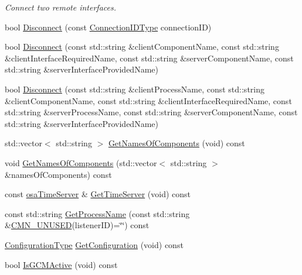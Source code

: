 \begin{DoxyCompactItemize}
\begin{DoxyCompactList}\small\item\em Connect two remote interfaces. \end{DoxyCompactList}\item 
bool \hyperlink{classmts_manager_local_a1c9d984c15b9f2f2e895db18cca18ece}{Disconnect} (const \hyperlink{mts_forward_declarations_8h_ad3543bb11742e1766374ec96016d6547}{Connection\+I\+D\+Type} connection\+I\+D)
\item 
bool \hyperlink{classmts_manager_local_a2895172c0982e44924222883608a8355}{Disconnect} (const std\+::string \&client\+Component\+Name, const std\+::string \&client\+Interface\+Required\+Name, const std\+::string \&server\+Component\+Name, const std\+::string \&server\+Interface\+Provided\+Name)
\item 
bool \hyperlink{classmts_manager_local_abe60ef9db8f2df43b7339fe45ac9de3c}{Disconnect} (const std\+::string \&client\+Process\+Name, const std\+::string \&client\+Component\+Name, const std\+::string \&client\+Interface\+Required\+Name, const std\+::string \&server\+Process\+Name, const std\+::string \&server\+Component\+Name, const std\+::string \&server\+Interface\+Provided\+Name)
\item 
std\+::vector$<$ std\+::string $>$ \hyperlink{classmts_manager_local_a0afcbf7ef6ce076a51cc9a34e8c2dd65}{Get\+Names\+Of\+Components} (void) const 
\item 
void \hyperlink{classmts_manager_local_a7b01b7bd0672bca97fb77350091ec56e}{Get\+Names\+Of\+Components} (std\+::vector$<$ std\+::string $>$ \&names\+Of\+Components) const 
\item 
const \hyperlink{classosa_time_server}{osa\+Time\+Server} \& \hyperlink{classmts_manager_local_ad45868b4726c291d104a7ac4e8848ada}{Get\+Time\+Server} (void) const 
\item 
const std\+::string \hyperlink{classmts_manager_local_a9ab62a582d5d349ce0b774f446267b8c}{Get\+Process\+Name} (const std\+::string \&\hyperlink{cmn_portability_8h_a021894e2626935fa2305434b1e893ff6}{C\+M\+N\+\_\+\+U\+N\+U\+S\+E\+D}(listener\+I\+D)=\char`\"{}\char`\"{}) const 
\item 
\hyperlink{classmts_manager_local_ade8a34bedd1d420d29c591711913046a}{Configuration\+Type} \hyperlink{classmts_manager_local_a9a0ed82c62c5bd653fef66f44e0c3493}{Get\+Configuration} (void) const 
\item 
bool \hyperlink{classmts_manager_local_aa56c7d6e7d559a4af44ed06e2a4a9f02}{Is\+G\+C\+M\+Active} (void) const 
\item 

\end{DoxyCompactItemize}
